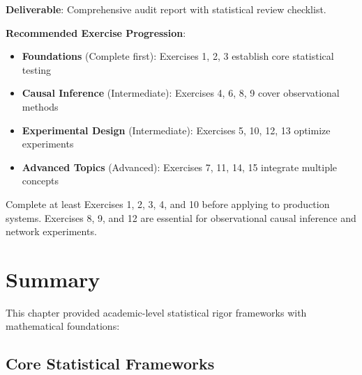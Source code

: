 \textbf{Deliverable}: Comprehensive audit report with statistical review checklist.

\vspace{1cm}

\textbf{Recommended Exercise Progression}:

\begin{itemize}
    \item \textbf{Foundations} (Complete first): Exercises 1, 2, 3 establish core statistical testing
    \item \textbf{Causal Inference} (Intermediate): Exercises 4, 6, 8, 9 cover observational methods
    \item \textbf{Experimental Design} (Intermediate): Exercises 5, 10, 12, 13 optimize experiments
    \item \textbf{Advanced Topics} (Advanced): Exercises 7, 11, 14, 15 integrate multiple concepts
\end{itemize}

Complete at least Exercises 1, 2, 3, 4, and 10 before applying to production systems. Exercises 8, 9, and 12 are essential for observational causal inference and network experiments.

\section{Summary}

This chapter provided academic-level statistical rigor frameworks with mathematical foundations:

\subsection{Core Statistical Frameworks}

